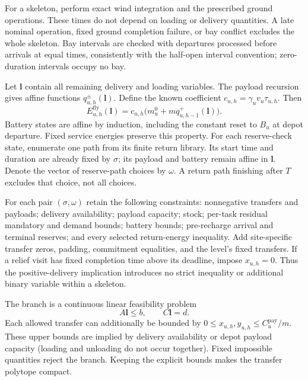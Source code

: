 For a skeleton, perform exact wind integration and the prescribed ground
operations. These times do not depend on loading or delivery quantities.
A late nominal operation, fixed ground completion failure, or bay conflict
excludes the whole skeleton. Bay intervals are checked with departures
processed before arrivals at equal times, consistently with the half-open
interval convention; zero-duration intervals occupy no bay.

Let $\mathbf l$ contain all remaining delivery and loading variables.
The payload recursion gives affine functions
$q_{u,h}^{\pm}(\mathbf l)$. Define the known coefficient
$c_{u,h}=\gamma_u v_u\tau_{u,h}$. Then
\begin{equation}
E_{u,h}^{\mathrm{fly}}(\mathbf l)
=c_{u,h}\bigl(m_u^0+m q_{u,h-1}^{+}(\mathbf l)\bigr).
\label{eq:supp_affine_energy}
\end{equation}
Battery states are affine by induction, including the constant reset to
$B_u$ at depot departure. Fixed service energies preserve this property.
For each reserve-check state, enumerate one path from its finite return
library. Its start time and duration are already fixed by $\sigma$;
its payload and battery remain affine in $\mathbf l$.
Denote the vector of reserve-path choices by $\omega$.
A return path finishing after $T$ excludes that choice, not all choices.

For each pair $(\sigma,\omega)$ retain the following constraints:
nonnegative transfers and payloads; delivery availability; payload
capacity; stock; per-task residual mandatory and demand bounds; battery
bounds; pre-recharge arrival and terminal reserves; and every selected
return-energy inequality. Add site-specific transfer zeros, padding,
commitment equalities, and the level's fixed transfers. If a relief visit
has fixed completion time above its deadline, impose $x_{u,h}=0$.
Thus the positive-delivery implication introduces no strict inequality
or additional binary variable within a skeleton.

The branch is a continuous linear feasibility problem
\begin{equation}
A\mathbf l\le b,\qquad C\mathbf l=d.
\label{eq:supp_branch_lp}
\end{equation}
Each allowed transfer can additionally be bounded by
$0\le x_{u,h},y_{u,h}\le C_u^{\mathrm{pay}}/m$.
These upper bounds are implied by delivery availability or depot payload
capacity (loading and unloading do not occur together). Fixed impossible
quantities reject the branch. Keeping the explicit bounds makes the
transfer polytope compact.

